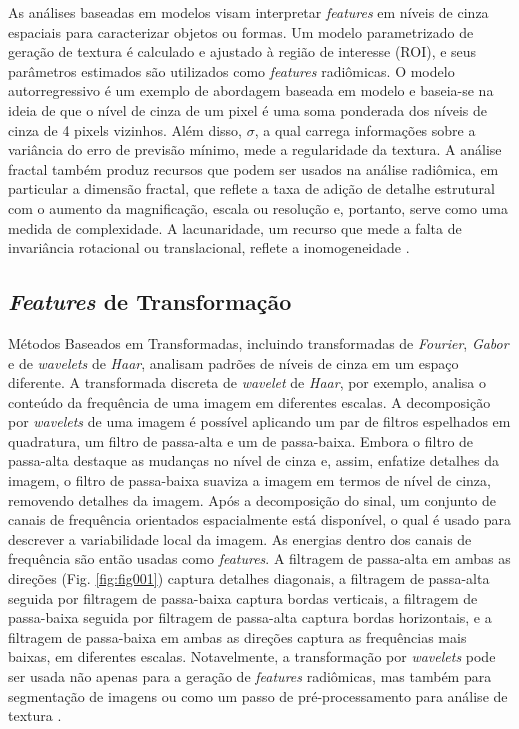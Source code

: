As análises baseadas em modelos visam interpretar \textit{features} em níveis de cinza espaciais para caracterizar objetos ou formas. Um modelo parametrizado de geração de textura é calculado e ajustado à região de interesse (ROI), e seus parâmetros estimados são utilizados como \textit{features} radiômicas. O modelo autorregressivo é um exemplo de abordagem baseada em modelo e baseia-se na ideia de que o nível de cinza de um pixel é uma soma ponderada dos níveis de cinza de 4 pixels vizinhos. Além disso, $\sigma$, a qual carrega informações sobre a variância do erro de previsão mínimo, mede a regularidade da textura. A análise fractal também produz recursos que podem ser usados na análise radiômica, em particular a dimensão fractal, que reflete a taxa de adição de detalhe estrutural com o aumento da magnificação, escala ou resolução e, portanto, serve como uma medida de complexidade. A lacunaridade, um recurso que mede a falta de invariância rotacional ou translacional, reflete a inomogeneidade \cite{mayerhoeferIntroductionRadiomics2020}.

\subsection{\textit{Features} de Transformação}
Métodos Baseados em Transformadas, incluindo transformadas de \textit{Fourier}, \textit{Gabor} e de \textit{wavelets} de \textit{Haar}, analisam padrões de níveis de cinza em um espaço diferente. A transformada discreta de \textit{wavelet} de \textit{Haar}, por exemplo, analisa o conteúdo da frequência de uma imagem em diferentes escalas. A decomposição por \textit{wavelets} de uma imagem é possível aplicando um par de filtros espelhados em quadratura, um filtro de passa-alta e um de passa-baixa. Embora o filtro de passa-alta destaque as mudanças no nível de cinza e, assim, enfatize detalhes da imagem, o filtro de passa-baixa suaviza a imagem em termos de nível de cinza, removendo detalhes da imagem. Após a decomposição do sinal, um conjunto de canais de frequência orientados espacialmente está disponível, o qual é usado para descrever a variabilidade local da imagem. As energias dentro dos canais de frequência são então usadas como \textit{features}. A filtragem de passa-alta em ambas as direções (Fig. \ref{fig:fig001}) captura detalhes diagonais, a filtragem de passa-alta seguida por filtragem de passa-baixa captura bordas verticais, a filtragem de passa-baixa seguida por filtragem de passa-alta captura bordas horizontais, e a filtragem de passa-baixa em ambas as direções captura as frequências mais baixas, em diferentes escalas. Notavelmente, a transformação por \textit{wavelets} pode ser usada não apenas para a geração de \textit{features} radiômicas, mas também para segmentação de imagens ou como um passo de pré-processamento para análise de textura \cite{mayerhoeferIntroductionRadiomics2020}.

